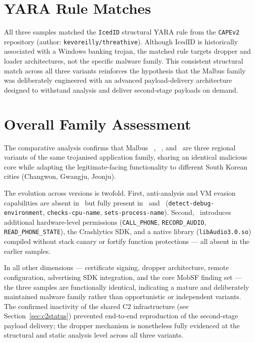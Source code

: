 \section{YARA Rule Matches}

All three samples matched the \texttt{IcedID} structural YARA rule from the \texttt{CAPEv2} repository (author: \texttt{kevoreilly/threathive}).
Although IcedID is historically associated with a Windows banking trojan, the matched rule targets dropper and loader architectures, not the specific malware family.
This consistent structural match across all three variants reinforces the hypothesis that the Malbus family was deliberately engineered with an advanced payload-delivery architecture designed to withstand analysis and deliver second-stage payloads on demand.

\section{Overall Family Assessment}

The comparative analysis confirms that Malbus \oner \ , \twor \ , and \threer \  are three regional variants of the same trojanised application family, sharing an identical malicious core while adapting the legitimate-facing functionality to different South Korean cities (Changwon, Gwangju, Jeonju).

The evolution across versions is twofold.
First, anti-analysis and VM evasion capabilities are absent in \oner \  but fully present in \twor \  and \threer \  (\texttt{detect-debug-environment}, \texttt{checks-cpu-name}, \texttt{sets-process-name}).
Second, \threer \  introduces additional hardware-level permissions (\texttt{CALL\_PHONE}, \texttt{RECORD\_AUDIO}, \texttt{READ\_PHONE\_STATE}), the Crashlytics SDK, and a native library (\texttt{libAudio3.0.so}) compiled without stack canary or fortify function protections --- all absent in the earlier samples.

In all other dimensions --- certificate signing, dropper architecture, remote configuration, advertising SDK integration, and the core MobSF finding set --- the three samples are functionally identical, indicating a mature and deliberately maintained malware family rather than opportunistic or independent variants.
The confirmed inactivity of the shared C2 infrastructure (see Section~\ref{sec:c2status}) prevented end-to-end reproduction of the second-stage payload delivery; the dropper mechanism is nonetheless fully evidenced at the structural and static analysis level across all three variants.
